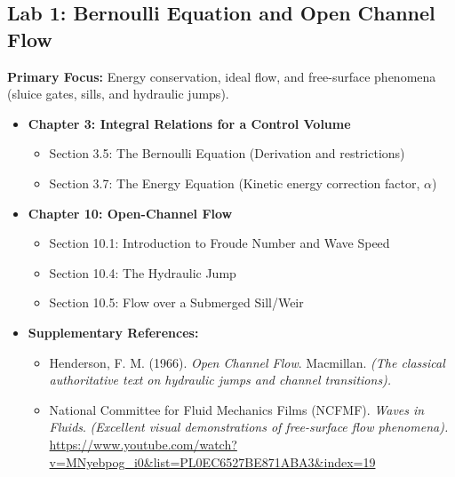 \documentclass[12pt,letterpaper]{article}
\begin{document}
\subsection*{Lab 1: Bernoulli Equation and Open Channel Flow}
\textbf{Primary Focus:} Energy conservation, ideal flow, and free-surface phenomena (sluice gates, sills, and hydraulic jumps).
\begin{itemize}
    \item \textbf{Chapter 3: Integral Relations for a Control Volume}
    \begin{itemize}
        \item Section 3.5: The Bernoulli Equation (Derivation and restrictions)
        \item Section 3.7: The Energy Equation (Kinetic energy correction factor, $\alpha$)
    \end{itemize}
    \item \textbf{Chapter 10: Open-Channel Flow} 
    
    \begin{itemize}
        \item Section 10.1: Introduction to Froude Number and Wave Speed
        \item Section 10.4: The Hydraulic Jump
        \item Section 10.5: Flow over a Submerged Sill/Weir
    \end{itemize}

    \item \textbf{Supplementary References:}
    \begin{itemize}
        \item Henderson, F. M. (1966). \textit{Open Channel Flow}. Macmillan. \textit{(The classical authoritative text on hydraulic jumps and channel transitions).}
        \item National Committee for Fluid Mechanics Films (NCFMF). \textit{Waves in Fluids}. \textit{(Excellent visual demonstrations of free-surface flow phenomena).} \url{https://www.youtube.com/watch?v=MNyebpog_i0&list=PL0EC6527BE871ABA3&index=19}
    \end{itemize}
\end{itemize}
\end{document}
